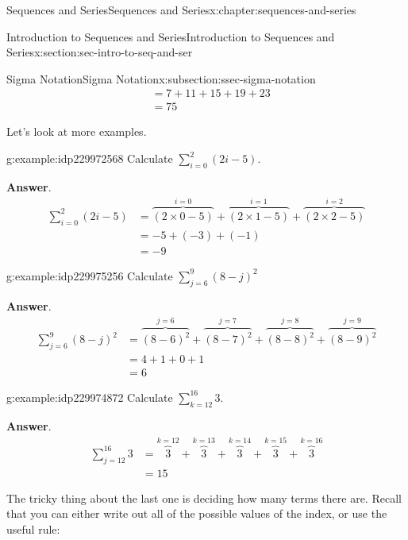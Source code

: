 \documentclass[twoside,10pt,]{book}
\newcommand{\blocktitlefont}{\relax}
\numberwithin{equation}{section}
\newcommand{\amp}{&}
\begin{document}
\begin{chapterptx}{Sequences and Series}{}{Sequences and Series}{}{}{x:chapter:sequences-and-series}
\begin{sectionptx}{Introduction to Sequences and Series}{}{Introduction to Sequences and Series}{}{}{x:section:sec-intro-to-seq-and-ser}
\begin{subsectionptx}{Sigma Notation}{}{Sigma Notation}{}{}{x:subsection:ssec-sigma-notation}
\begin{align*}
\amp = 7 + 11 + 15 + 19 + 23\\
\amp = 75
\end{align*}
%
\par
Let's look at more examples. \begin{example}{}{g:example:idp229972568}%
Calculate \(\sum\limits_{i = 0}^2 {(2i - 5)}\).\par\smallskip%
\noindent\textbf{\blocktitlefont Answer}.\label{g:answer:idp229976536}{}\hypertarget{g:answer:idp229976536}{}\quad{}%
\begin{align*}
\sum\limits_{i = 0}^2 {(2i - 5)} \amp = \overbrace {\left( {2 \times 0 - 5} \right)}^{i = 0} + \overbrace {\left( {2 \times 1 - 5} \right)}^{i = 1} + \overbrace {\left( {2 \times 2 - 5} \right)}^{i = 2}\\
\amp =  -5 + (- 3) +  (- 1)\\
\amp = -9
\end{align*}
\end{example}
 \begin{example}{}{g:example:idp229975256}%
Calculate \(\sum\limits_{j = 6}^9 {{{\left( {8 - j} \right)}^2}}\)\par\smallskip%
\noindent\textbf{\blocktitlefont Answer}.\label{g:answer:idp229978456}{}\hypertarget{g:answer:idp229978456}{}\quad{}%
\begin{align*}
\sum\limits_{j = 6}^9 {{{\left( {8 - j} \right)}^2}} \amp =\overbrace {\left( {8 - 6} \right)^2} ^{j = 6} + \overbrace {\left( {8 - 7} \right)^2} ^{j = 7} + \overbrace {\left( {8 - 8} \right)^2} ^{j = 8} + \overbrace {\left( {8 - 9} \right)^2}^{j = 9}\\
\amp = 4+1+0+1\\
\amp = 6
\end{align*}
\end{example}
 \begin{example}{}{g:example:idp229974872}%
Calculate \(\sum\limits_{k = 12}^{16} 3\).\par\smallskip%
\noindent\textbf{\blocktitlefont Answer}.\label{g:answer:idp229975128}{}\hypertarget{g:answer:idp229975128}{}\quad{}%
\begin{align*}
\sum\limits_{j = 12}^{16} 3 \amp = \overbrace{3}^{k=12} + \overbrace{3}^{k=13} + \overbrace{3}^{k=14} + \overbrace{3}^{k=15} + \overbrace{3}^{k=16}\\
\amp = 15
\end{align*}
\end{example}
%
\par
The tricky thing about the last one is deciding how many terms there are.  Recall that you can either write out all of the possible values of the index, or use the useful rule:%

\end{subsectionptx}
\end{sectionptx}
\end{chapterptx}
\end{document}
